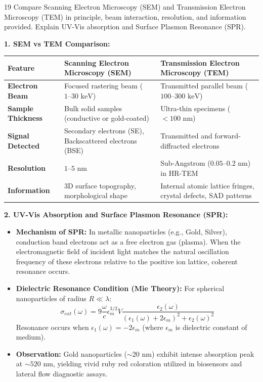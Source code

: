 \begin{theoryq}{19}
Compare Scanning Electron Microscopy (SEM) and Transmission Electron Microscopy (TEM) in principle, beam interaction, resolution, and information provided. Explain UV-Vis absorption and Surface Plasmon Resonance (SPR).
\end{theoryq}
\begin{theorysol}
\textbf{1. SEM vs TEM Comparison:}
\begin{center}
\begin{tabularx}{\textwidth}{|l|X|X|}
\hline
\textbf{Feature} & \textbf{Scanning Electron Microscopy (SEM)} & \textbf{Transmission Electron Microscopy (TEM)} \\
\hline
\textbf{Electron Beam} & Focused rastering beam ($1\text{--}30\text{ keV}$) & Transmitted parallel beam ($100\text{--}300\text{ keV}$) \\
\textbf{Sample Thickness} & Bulk solid samples (conductive or gold-coated) & Ultra-thin specimens ($<100\text{ nm}$) \\
\textbf{Signal Detected} & Secondary electrons (SE), Backscattered electrons (BSE) & Transmitted and forward-diffracted electrons \\
\textbf{Resolution} & $1\text{--}5\text{ nm}$ & Sub-Angstrom ($0.05\text{--}0.2\text{ nm}$) in HR-TEM \\
\textbf{Information} & 3D surface topography, morphological shape & Internal atomic lattice fringes, crystal defects, SAD patterns \\
\hline
\end{tabularx}
\end{center}

\textbf{2. UV-Vis Absorption and Surface Plasmon Resonance (SPR):}
\begin{itemize}
\item \textbf{Mechanism of SPR:} In metallic nanoparticles (e.g., Gold, Silver), conduction band electrons act as a free electron gas (plasma). When the electromagnetic field of incident light matches the natural oscillation frequency of these electrons relative to the positive ion lattice, coherent resonance occurs.
\item \textbf{Dielectric Resonance Condition (Mie Theory):}
For spherical nanoparticles of radius $R \ll \lambda$:
\begin{equation}
\sigma_{ext}(\omega) = 9 \frac{\omega}{c} \epsilon_m^{3/2} V \frac{\epsilon_2(\omega)}{(\epsilon_1(\omega) + 2\epsilon_m)^2 + \epsilon_2(\omega)^2}
\end{equation}
Resonance occurs when $\epsilon_1(\omega) = -2\epsilon_m$ (where $\epsilon_m$ is dielectric constant of medium).
\item \textbf{Observation:} Gold nanoparticles ($\sim 20\text{ nm}$) exhibit intense absorption peak at $\sim 520\text{ nm}$, yielding vivid ruby red coloration utilized in biosensors and lateral flow diagnostic assays.
\end{itemize}

\end{theorysol}
\vspace{4mm}

